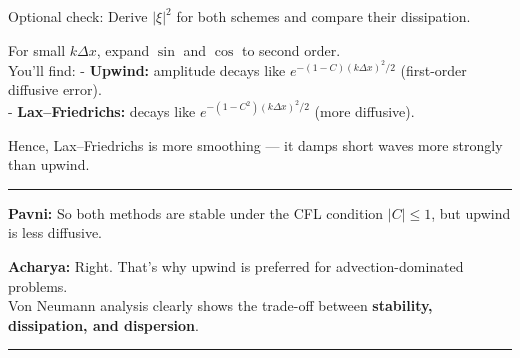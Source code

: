 \documentclass[
  letterpaper,
]{book}
\begin{document}
Optional check: Derive \(|\xi|^2\) for both schemes and compare their
dissipation.

For small \(k\Delta x\), expand \(\sin\) and \(\cos\) to second order.\\
You'll find: - \textbf{Upwind:} amplitude decays like
\(e^{-(1-C)(k\Delta x)^2/2}\) (first-order diffusive error).\\
- \textbf{Lax--Friedrichs:} decays like \(e^{-(1-C^2)(k\Delta x)^2/2}\)
(more diffusive).

Hence, Lax--Friedrichs is more smoothing --- it damps short waves more
strongly than upwind.

\begin{center}\rule{0.5\linewidth}{0.5pt}\end{center}

\textbf{Pavni:} So both methods are stable under the CFL condition
\(|C|\le1\), but upwind is less diffusive.

\textbf{Acharya:} Right. That's why upwind is preferred for
advection-dominated problems.\\
Von Neumann analysis clearly shows the trade-off between
\textbf{stability, dissipation, and dispersion}.

\begin{center}\rule{0.5\linewidth}{0.5pt}\end{center}


\backmatter
\end{document}
